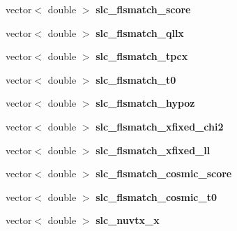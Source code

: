 \begin{DoxyCompactItemize}
\item 
\hypertarget{classUBXSecEvent_aac7860c3885997956aabf560254afb42}{vector$<$ double $>$ {\bfseries slc\-\_\-flsmatch\-\_\-score}}\label{classUBXSecEvent_aac7860c3885997956aabf560254afb42}

\item 
\hypertarget{classUBXSecEvent_abc1d1ba9d1ce91ae8784f3e99deb6ebb}{vector$<$ double $>$ {\bfseries slc\-\_\-flsmatch\-\_\-qllx}}\label{classUBXSecEvent_abc1d1ba9d1ce91ae8784f3e99deb6ebb}

\item 
\hypertarget{classUBXSecEvent_afc096cb78a5130678717f9c513e6b90c}{vector$<$ double $>$ {\bfseries slc\-\_\-flsmatch\-\_\-tpcx}}\label{classUBXSecEvent_afc096cb78a5130678717f9c513e6b90c}

\item 
\hypertarget{classUBXSecEvent_af4f355424e0a80580b581268eb25dd12}{vector$<$ double $>$ {\bfseries slc\-\_\-flsmatch\-\_\-t0}}\label{classUBXSecEvent_af4f355424e0a80580b581268eb25dd12}

\item 
\hypertarget{classUBXSecEvent_a237e3f0d9a59f740ee1725fd7d8186bd}{vector$<$ double $>$ {\bfseries slc\-\_\-flsmatch\-\_\-hypoz}}\label{classUBXSecEvent_a237e3f0d9a59f740ee1725fd7d8186bd}

\item 
\hypertarget{classUBXSecEvent_a51b8f4fca1456ceba66f171ac8e9eb4a}{vector$<$ double $>$ {\bfseries slc\-\_\-flsmatch\-\_\-xfixed\-\_\-chi2}}\label{classUBXSecEvent_a51b8f4fca1456ceba66f171ac8e9eb4a}

\item 
\hypertarget{classUBXSecEvent_a1bf76c945234f61391ad4d287862f2a8}{vector$<$ double $>$ {\bfseries slc\-\_\-flsmatch\-\_\-xfixed\-\_\-ll}}\label{classUBXSecEvent_a1bf76c945234f61391ad4d287862f2a8}

\item 
\hypertarget{classUBXSecEvent_ad74c03fcc0b57d4084eb05d0f5617b3a}{vector$<$ double $>$ {\bfseries slc\-\_\-flsmatch\-\_\-cosmic\-\_\-score}}\label{classUBXSecEvent_ad74c03fcc0b57d4084eb05d0f5617b3a}

\item 
\hypertarget{classUBXSecEvent_a645973d4e447d46008828658b826e8f0}{vector$<$ double $>$ {\bfseries slc\-\_\-flsmatch\-\_\-cosmic\-\_\-t0}}\label{classUBXSecEvent_a645973d4e447d46008828658b826e8f0}

\item 
\hypertarget{classUBXSecEvent_ac97e86f7559ceb52bacb97bd60c25f09}{vector$<$ double $>$ {\bfseries slc\-\_\-nuvtx\-\_\-x}}\label{classUBXSecEvent_ac97e86f7559ceb52bacb97bd60c25f09}


\end{DoxyCompactItemize}
